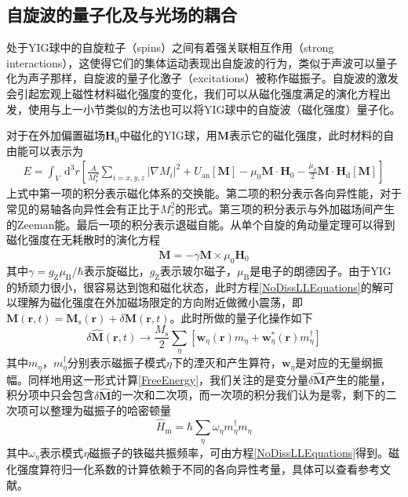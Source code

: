 \subsection{自旋波的量子化及与光场的耦合}
处于YIG球中的自旋粒子（spins）之间有着强关联相互作用（strong interactions），这使得它们的集体运动表现出自旋波的行为，类似于声波可以量子化为声子那样，自旋波的量子化激子（excitations）被称作磁振子\ChangeNotation。自旋波的激发会引起宏观上磁性材料磁化强度的变化，我们可以从磁化强度满足的演化方程出发，使用与上一小节类似的方法也可以将YIG球中的自旋波（磁化强度）量子化。

对于在外加偏置磁场$\mathbf{H}_0$中磁化的YIG球，用$\mathbf{M}$表示它的磁化强度，此时材料的自由能可以表示为\cite{reviewCavityMagnonics}
\begin{equation}
\begin{aligned}
E=\int_{V} \mathrm{~d}^{3} r \left[\frac{A}{M_{\mathrm{s}}^{2}} \sum_{i=x, y, z}\left|\nabla M_{i}\right|^{2}+U_{\mathrm{an}}[\mathbf{M}]-\mu_{0} \mathbf{M} \cdot \mathbf{H}_{0}-\frac{\mu_{0}}{2} \mathbf{M} \cdot \mathbf{H}_{\mathrm{d}}[\mathbf{M}]\right]
\label{FreeEnergy}
\end{aligned}
\end{equation}
上式中第一项的积分表示磁化体系的交换能。第二项的积分表示各向异性能，对于常见的易轴各向异性会有正比于$M_z^2$的形式。第三项的积分表示与外加磁场间产生的Zeeman能。最后一项的积分表示退磁自能。从单个自旋的角动量定理可以得到磁化强度在无耗散时的演化方程
\begin{equation}
\dot{\mathbf{M}}=-\gamma \mathbf{M} \times \mu_{0} \mathbf{H}_{0}
\label{NoDissLLEquations}
\end{equation}
其中$\gamma=g_{\mathrm{Z}} \mu_{\mathrm{B}} / \hbar$表示旋磁比，$g_{\mathrm{Z}}$表示玻尔磁子，$\mu_{\mathrm{B}}$是电子的朗德因子。由于YIG的矫顽力很小，很容易达到饱和磁化状态，此时方程\eqref{NoDissLLEquations}的解可以理解为磁化强度在外加磁场限定的方向附近做微小震荡，即$\mathbf{M}(\mathbf{r},t)=\mathbf{M}_{\mathrm{s}}(\mathbf{r})+\delta \mathbf{M}(\mathbf{r}, t)$。此时所做的量子化操作如下\cite{reviewCavityMagnonics}
\begin{equation}
\delta \hat{\mathbf{M}}(\mathbf{r}, t) \rightarrow \frac{M_{\mathrm{s}}}{2} \sum_{\eta}\left[\mathbf{w}_{\eta}(\mathbf{r}) {m}_{\eta}+\mathbf{w}_{\eta}^{*}(\mathbf{r}) {m}_{\eta}^{\dagger}\right]
\label{MOperator}
\end{equation}
其中${m}_{\eta}$，${m}_{\eta}^{\dagger}$分别表示磁振子模式$\eta$下的湮灭和产生算符，$\mathbf{w}_{\eta}$是对应的无量纲振幅\ChangeNotation。同样地用这一形式计算\eqref{FreeEnergy}，我们关注的是变分量$\delta \hat{\mathbf{M}}$产生的能量\ChangeNotation，积分项中只会包含$\delta \hat{\mathbf{M}}$的一次和二次项，而一次项的积分我们认为是零，剩下的二次项可以整理为磁振子的哈密顿量
\begin{equation}
\hat{H}_{\mathrm{m}}=\hbar \sum_{\eta} \omega_{\eta} {m}_{\eta}^{\dagger} {m}_{\eta}
\end{equation}
其中$\omega_{\eta}$表示模式${\eta}$磁振子的铁磁共振频率，可由方程\eqref{NoDissLLEquations}得到\cite{kittel2005introduction}。磁化强度算符归一化系数的计算依赖于不同的各向异性考量，具体可以查看参考文献\ChangeNotation\cite{reviewCavityMagnonics}。

